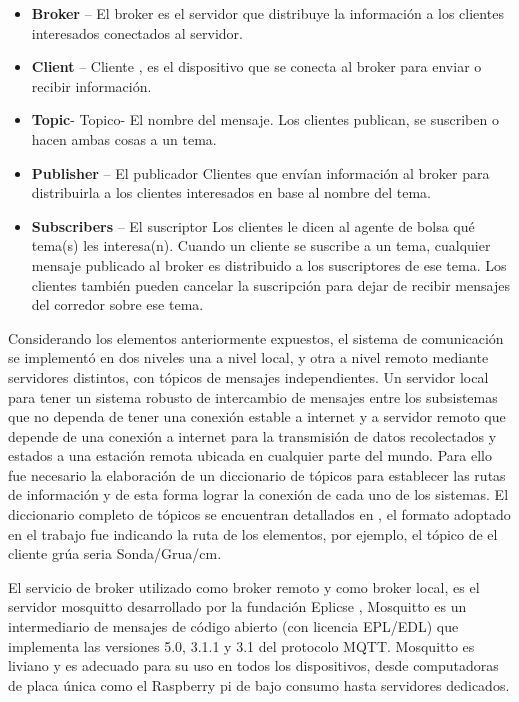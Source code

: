 \begin{itemize}
    \item \textbf{Broker} – El broker es el servidor que distribuye la información a los clientes interesados conectados al servidor.
    \item \textbf{Client} – Cliente , es el dispositivo que se conecta al broker para enviar o recibir información.
    \item \textbf{Topic}- Topico- El nombre del mensaje. Los clientes publican, se suscriben o hacen ambas cosas a un tema.
    \item \textbf{Publisher} – El publicador Clientes que envían información al broker para distribuirla a los clientes interesados en base al nombre del tema.
    \item \textbf{Subscribers} – El suscriptor Los clientes le dicen al agente de bolsa qué tema(s) les interesa(n). Cuando un cliente se suscribe a un tema, cualquier mensaje publicado al broker es distribuido a los suscriptores de ese tema. Los clientes también pueden cancelar la suscripción para dejar de recibir mensajes del corredor sobre ese tema.
\end{itemize}

Considerando los elementos anteriormente expuestos, el sistema de comunicación se implementó en dos niveles una a nivel local, y otra a nivel remoto mediante servidores distintos, con t\'opicos de mensajes independientes. 
Un servidor local para tener un sistema robusto de intercambio de mensajes entre los subsistemas que no dependa de tener una conexi\'on estable a internet y a servidor remoto que depende de una conexi\'on a internet para la transmisi\'on de datos recolectados y estados a una estación remota ubicada en cualquier parte del mundo. 
Para ello fue necesario la elaboraci\'on de un diccionario de t\'opicos para establecer las rutas de informaci\'on y de esta forma lograr la conexi\'on de cada uno de los sistemas. El diccionario completo de t\'opicos se encuentran detallados en , el formato adoptado en el trabajo fue indicando la ruta de los elementos, por ejemplo, el tópico de el cliente gr\'ua seria Sonda/Grua/cm.

El servicio de broker utilizado como broker remoto y como broker local, es el servidor mosquitto desarrollado por la fundaci\'on Eplicse \cite{mosquitto_eclipse_2018}, Mosquitto es un intermediario de mensajes de código abierto (con licencia EPL/EDL) que implementa las versiones 5.0, 3.1.1 y 3.1 del protocolo MQTT. Mosquitto es liviano y es adecuado para su uso en todos los dispositivos, desde computadoras de placa única como el Raspberry pi de bajo consumo hasta servidores dedicados.

